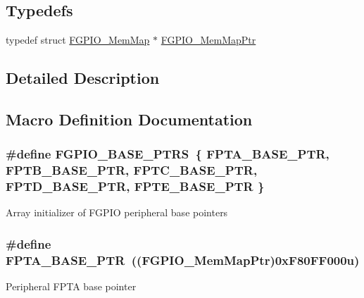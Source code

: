 \subsection*{Typedefs}
\begin{DoxyCompactItemize}
\item 
typedef struct \hyperlink{struct_f_g_p_i_o___mem_map}{F\+G\+P\+I\+O\+\_\+\+Mem\+Map} $\ast$ \hyperlink{group___f_g_p_i_o___peripheral_gaeed3beeb5e5c99ae5b0e404b21466e55}{F\+G\+P\+I\+O\+\_\+\+Mem\+Map\+Ptr}
\end{DoxyCompactItemize}


\subsection{Detailed Description}


\subsection{Macro Definition Documentation}
\hypertarget{group___f_g_p_i_o___peripheral_ga58956e4d0a0ffec3e1dd70e77a5160b4}{}
\subsubsection[{F\+G\+P\+I\+O\+\_\+\+B\+A\+S\+E\+\_\+\+P\+T\+R\+S}]{\setlength{\rightskip}{0pt plus 5cm}\#define F\+G\+P\+I\+O\+\_\+\+B\+A\+S\+E\+\_\+\+P\+T\+R\+S~\{ {\bf F\+P\+T\+A\+\_\+\+B\+A\+S\+E\+\_\+\+P\+T\+R}, {\bf F\+P\+T\+B\+\_\+\+B\+A\+S\+E\+\_\+\+P\+T\+R}, {\bf F\+P\+T\+C\+\_\+\+B\+A\+S\+E\+\_\+\+P\+T\+R}, {\bf F\+P\+T\+D\+\_\+\+B\+A\+S\+E\+\_\+\+P\+T\+R}, {\bf F\+P\+T\+E\+\_\+\+B\+A\+S\+E\+\_\+\+P\+T\+R} \}}\label{group___f_g_p_i_o___peripheral_ga58956e4d0a0ffec3e1dd70e77a5160b4}
Array initializer of F\+G\+P\+I\+O peripheral base pointers \hypertarget{group___f_g_p_i_o___peripheral_ga4b0d89f517528ab7c1d2fdefe4c863d8}{}
\subsubsection[{F\+P\+T\+A\+\_\+\+B\+A\+S\+E\+\_\+\+P\+T\+R}]{\setlength{\rightskip}{0pt plus 5cm}\#define F\+P\+T\+A\+\_\+\+B\+A\+S\+E\+\_\+\+P\+T\+R~(({\bf F\+G\+P\+I\+O\+\_\+\+Mem\+Map\+Ptr})0x\+F80\+F\+F000u)}\label{group___f_g_p_i_o___peripheral_ga4b0d89f517528ab7c1d2fdefe4c863d8}
Peripheral F\+P\+T\+A base pointer \hypertarget{group___f_g_p_i_o___peripheral_ga725ec21a43213bffe0aa484f7406bcf5}{}
